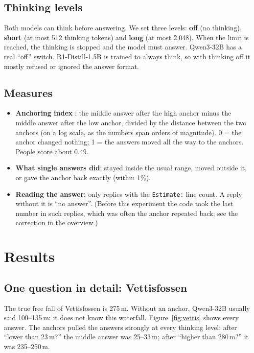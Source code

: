 \documentclass[11pt,a4paper]{article}
\begin{document}
\subsection{Thinking levels}
Both models can think before answering. We set three levels: \textbf{off} (no thinking), \textbf{short} (at most 512 thinking tokens) and \textbf{long} (at most 2,048). When the limit is reached, the thinking is stopped and the model must answer. Qwen3-32B has a real \enquote{off} switch. R1-Distill-1.5B is trained to always think, so with thinking off it mostly refused or ignored the answer format.

\subsection{Measures}
\begin{itemize}[leftmargin=*]
  \item \textbf{Anchoring index} \citep{jacowitz1995measures}: the middle answer after the high anchor minus the middle answer after the low anchor, divided by the distance between the two anchors (on a log scale, as the numbers span orders of magnitude). 0 = the anchor changed nothing; 1 = the answers moved all the way to the anchors. People score about 0.49.
  \item \textbf{What single answers did}: stayed inside the usual range, moved outside it, or gave the anchor back exactly (within 1\%).
  \item \textbf{Reading the answer:} only replies with the \texttt{Estimate:} line count. A reply without it is \enquote{no answer}. (Before this experiment the code took the last number in such replies, which was often the anchor repeated back; see the correction in the overview.)
\end{itemize}

\section{Results}

\subsection{One question in detail: Vettisfossen}

The true free fall of Vettisfossen is 275\,m. Without an anchor, Qwen3-32B usually said 100--135\,m: it does not know this waterfall. Figure~\ref{fig:vettis} shows every answer. The anchors pulled the answers strongly at every thinking level: after \enquote{lower than 23\,m?} the middle answer was 25--33\,m; after \enquote{higher than 280\,m?} it was 235--250\,m.
\end{document}
